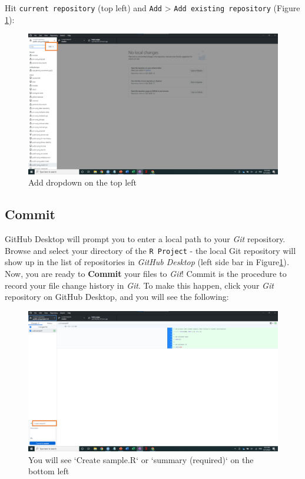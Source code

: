 \documentclass[
]{book}
\begin{document}
Hit \texttt{current\ repository} (top left) and \texttt{Add} \textgreater{} \texttt{Add\ existing\ repository} (Figure \ref{fig:gitdesktop2}):

\begin{figure}

{\centering \includegraphics[width=61.11in]{image/git_image03} 

}

\caption{Add dropdown on the top left}\label{fig:gitdesktop2}
\end{figure}

\hypertarget{commit}{%
\subsection{Commit}\label{commit}}

GitHub Desktop will prompt you to enter a local path to your \emph{Git} repository. Browse and select your directory of the \texttt{R\ Project} - the local Git repository will show up in the list of repositories in \emph{GitHub Desktop} (left side bar in Figure\ref{fig:gitdesktop2})\emph{.} Now, you are ready to \textbf{Commit} your files to \emph{Git}! Commit is the procedure to record your file change history in \emph{Git}. To make this happen, click your \emph{Git} repository on GitHub Desktop, and you will see the following:

\begin{figure}

{\centering \includegraphics[width=61.11in]{image/git_image04} 

}

\caption{You will see `Create sample.R` or `summary (required)` on the bottom left}\label{fig:gitdesktop3}
\end{figure}
\end{document}
